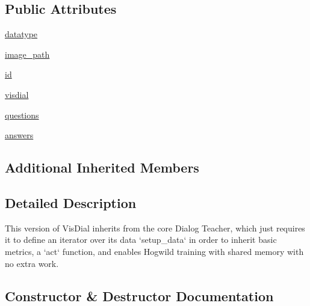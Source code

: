 \subsection*{Public Attributes}
\begin{DoxyCompactItemize}
\item 
\hyperlink{classparlai_1_1tasks_1_1visdial_1_1agents_1_1DefaultTeacher_ab0c8e86570399b0ea8f6c96c49dc1b38}{datatype}
\item 
\hyperlink{classparlai_1_1tasks_1_1visdial_1_1agents_1_1DefaultTeacher_a81c9d1779709d5dbf85b927ac4362496}{image\+\_\+path}
\item 
\hyperlink{classparlai_1_1tasks_1_1visdial_1_1agents_1_1DefaultTeacher_af57a8b4ff4119a00559189e2e1fb4ab9}{id}
\item 
\hyperlink{classparlai_1_1tasks_1_1visdial_1_1agents_1_1DefaultTeacher_a8cb96fb50b9c8d040dcb9bd8dd3d1d3e}{visdial}
\item 
\hyperlink{classparlai_1_1tasks_1_1visdial_1_1agents_1_1DefaultTeacher_a4e9d61cd05584be7a63d7407372ce13a}{questions}
\item 
\hyperlink{classparlai_1_1tasks_1_1visdial_1_1agents_1_1DefaultTeacher_a34ad9bd4ee7fcc11445e1df938f0d209}{answers}
\end{DoxyCompactItemize}
\subsection*{Additional Inherited Members}


\subsection{Detailed Description}
\begin{DoxyVerb}This version of VisDial inherits from the core Dialog Teacher, which just requires
it to define an iterator over its data `setup_data` in order to inherit basic
metrics, a `act` function, and enables Hogwild training with shared memory with no
extra work.
\end{DoxyVerb}
 

\subsection{Constructor \& Destructor Documentation}
\mbox{\label{classparlai_1_1tasks_1_1visdial_1_1agents_1_1DefaultTeacher_ad888b8b7612e78dec919a6769f7e0623}} 
